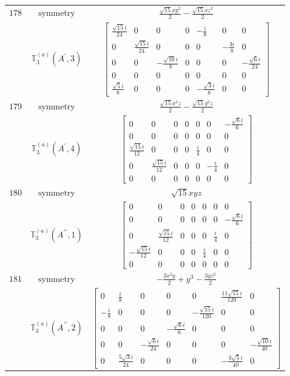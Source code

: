\documentclass[fleqn,8pt,landscape]{jsarticle}
\begin{document}
\begin{longtable}{ccc}
$ 178 $ & $ \text{symmetry} $ & $ \frac{\sqrt{15} x y^{2}}{2} - \frac{\sqrt{15} x z^{2}}{2} $ \\
$  $ & $ \mathbb{T}_{3}^{(a)}(A^{\prime},3) $ & $ \begin{bmatrix} \frac{\sqrt{15} i}{24} & 0 & 0 & 0 & - \frac{i}{8} & 0 & 0 \\ 0 & \frac{\sqrt{15} i}{24} & 0 & 0 & 0 & - \frac{3 i}{8} & 0 \\ 0 & 0 & - \frac{\sqrt{10} i}{8} & 0 & 0 & 0 & - \frac{\sqrt{6} i}{24} \\ 0 & 0 & 0 & 0 & 0 & 0 & 0 \\ \frac{\sqrt{5} i}{8} & 0 & 0 & 0 & - \frac{\sqrt{3} i}{8} & 0 & 0 \end{bmatrix} $ \\ \hline
$ 179 $ & $ \text{symmetry} $ & $ \frac{\sqrt{15} x^{2} z}{2} - \frac{\sqrt{15} y^{2} z}{2} $ \\
$  $ & $ \mathbb{T}_{3}^{(a)}(A^{\prime},4) $ & $ \begin{bmatrix} 0 & 0 & 0 & 0 & 0 & 0 & - \frac{\sqrt{6} i}{6} \\ 0 & 0 & 0 & 0 & 0 & 0 & 0 \\ \frac{\sqrt{15} i}{12} & 0 & 0 & 0 & \frac{i}{4} & 0 & 0 \\ 0 & \frac{\sqrt{15} i}{12} & 0 & 0 & 0 & - \frac{i}{4} & 0 \\ 0 & 0 & 0 & 0 & 0 & 0 & 0 \end{bmatrix} $ \\ \hline
$ 180 $ & $ \text{symmetry} $ & $ \sqrt{15} x y z $ \\
$  $ & $ \mathbb{T}_{3}^{(a)}(A^{\prime\prime},1) $ & $ \begin{bmatrix} 0 & 0 & 0 & 0 & 0 & 0 & 0 \\ 0 & 0 & 0 & 0 & 0 & 0 & - \frac{\sqrt{6} i}{6} \\ 0 & \frac{\sqrt{15} i}{12} & 0 & 0 & 0 & \frac{i}{4} & 0 \\ - \frac{\sqrt{15} i}{12} & 0 & 0 & 0 & \frac{i}{4} & 0 & 0 \\ 0 & 0 & 0 & 0 & 0 & 0 & 0 \end{bmatrix} $ \\ \hline
$ 181 $ & $ \text{symmetry} $ & $ - \frac{3 x^{2} y}{2} + y^{3} - \frac{3 y z^{2}}{2} $ \\
$  $ & $ \mathbb{T}_{3}^{(a)}(A^{\prime\prime},2) $ & $ \begin{bmatrix} 0 & \frac{i}{8} & 0 & 0 & 0 & \frac{11 \sqrt{15} i}{120} & 0 \\ - \frac{i}{8} & 0 & 0 & 0 & - \frac{\sqrt{15} i}{120} & 0 & 0 \\ 0 & 0 & 0 & - \frac{\sqrt{6} i}{6} & 0 & 0 & 0 \\ 0 & 0 & - \frac{\sqrt{6} i}{24} & 0 & 0 & 0 & - \frac{\sqrt{10} i}{40} \\ 0 & \frac{5 \sqrt{3} i}{24} & 0 & 0 & 0 & - \frac{3 \sqrt{5} i}{40} & 0 \end{bmatrix} $ \\ \hline

\end{longtable}
\end{document}
